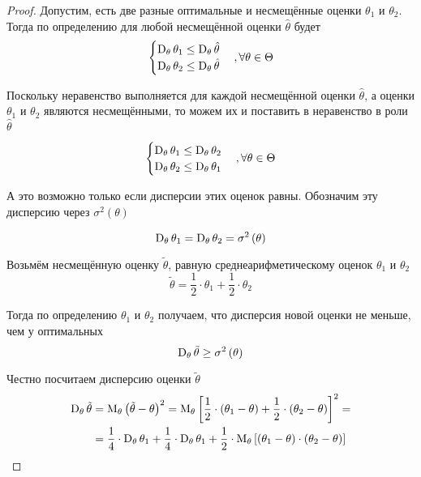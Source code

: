 \begin{proof}
    Допустим,
    есть две разные оптимальные и несмещённые оценки $\theta_1$ и $\theta_2$.
    Тогда по определению для любой несмещённой оценки $\hat{\theta}$ будет
    \begin{align*}
        \begin{cases}
            \operatorname{D}_{\theta} \theta_1
                \le\operatorname{D}_{\theta} \hat{\theta}\\
            \operatorname{D}_{\theta} \theta_2
                \le\operatorname{D}_{\theta} \hat{\theta}
        \end{cases}
        ,\forall\theta\in\Theta
    \end{align*}

    Поскольку неравенство выполняется
    для каждой несмещённой оценки $\hat{\theta}$,
    а оценки $\theta_1$ и $\theta_2$ являются несмещёнными,
    то можем их и поставить в неравенство в роли $\hat{\theta}$

    \begin{align*}
        \begin{cases}
            \operatorname{D}_{\theta} \theta_1
                \le\operatorname{D}_{\theta} \theta_2\\
            \operatorname{D}_{\theta} \theta_2
                \le\operatorname{D}_{\theta} \theta_1
        \end{cases}
        ,\forall\theta\in\Theta
    \end{align*}

    А это возможно только если дисперсии этих оценок равны.
    Обозначим эту дисперсию через $\sigma^2\left(\theta\right)$

    $$\operatorname{D}_{\theta} \theta_1
        =\operatorname{D}_{\theta} \theta_2
        =\sigma^2\left(\theta\right)$$

    Возьмём несмещённую оценку $\tilde{\theta}$,
    равную среднеарифметическому оценок $\theta_1$ и $\theta_2$
    $$\tilde{\theta}=\frac{1}{2}\cdot\theta_1+\frac{1}{2}\cdot\theta_2$$

    Тогда по определению $\theta_1$ и $\theta_2$ получаем,
    что дисперсия новой оценки не меньше, чем у оптимальных
    \begin{equation}\label{eq:estimator_ge}
        \operatorname{D}_{\theta} \tilde{\theta}\ge\sigma^2\left(\theta\right)
    \end{equation}

    Честно посчитаем дисперсию оценки $\tilde{\theta}$
    \begin{align*}
    \operatorname{D}_{\theta} \tilde{\theta}
        &=\operatorname{M}_{\theta} \left( \tilde{\theta}-\theta \right)^2
        =\operatorname{M}_{\theta} \left[ \frac{1}{2}\cdot\left( \theta_1-\theta \right)
            +\frac{1}{2}\cdot\left( \theta_2-\theta \right) \right]^2=\\
        &=\frac{1}{4}\cdot\operatorname{D}_{\theta} \theta_1
            +\frac{1}{4}\cdot\operatorname{D}_{\theta} \theta_1
            +\frac{1}{2}\cdot\operatorname{M}_{\theta} \left[ \left( \theta_1-\theta \right)
                    \cdot\left( \theta_2-\theta \right) \right]
    \end{align*}


\end{proof}
